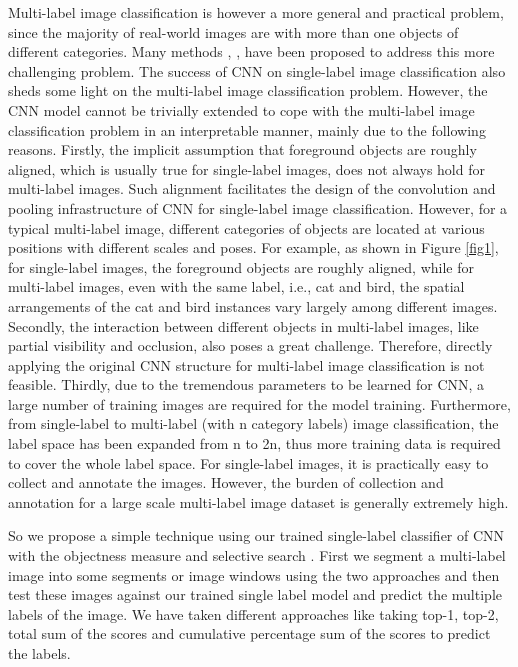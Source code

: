 Multi-label image classification is however a more
general and practical problem, since the majority of real-world images are with more than one objects
of different categories. Many methods \cite{12}, \cite{13}, \cite{14}
have been proposed to address this more challenging
problem. The success of CNN on single-label image
classification also sheds some light on the multi-label image classification problem. However, the CNN
model cannot be trivially extended to cope with the
multi-label image classification problem in an interpretable manner, mainly due to the following reasons.
Firstly, the implicit assumption that foreground objects are roughly aligned, which is usually true for
single-label images, does not always hold for multi-label images. Such alignment facilitates the design of
the convolution and pooling infrastructure of CNN
for single-label image classification. However, for a
typical multi-label image, different categories of objects are located at various positions with different
scales and poses. For example, as shown in Figure \ref{fig1},
for single-label images, the foreground objects are
roughly aligned, while for multi-label images, even
with the same label, i.e., cat and bird, the spatial arrangements of the cat and bird instances
vary largely among different images. Secondly, the
interaction between different objects in multi-label
images, like partial visibility and occlusion, also poses
a great challenge. Therefore, directly applying the
original CNN structure for multi-label image classification is not feasible. Thirdly, due to the tremendous
parameters to be learned for CNN, a large number of
training images are required for the model training.
Furthermore, from single-label to multi-label (with n
category labels) image classification, the label space
has been expanded from n to 2n, thus more training data is required to cover the whole label space. For
single-label images, it is practically easy to collect
and annotate the images. However, the burden of
collection and annotation for a large scale multi-label
image dataset is generally extremely high. \hfill \break

So we propose a simple technique using our trained single-label classifier of CNN with the objectness measure \cite{15} and selective search \cite{16}. First we segment a multi-label image into some segments or image windows using the two approaches and then test these images against our trained single label model and predict the multiple labels of the image. We have taken different approaches like taking top-1, top-2, total sum of the scores and cumulative percentage sum of the scores to predict the labels.

